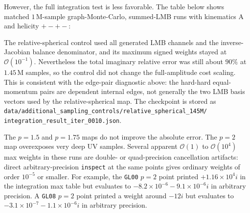 \documentclass[11pt]{article}
\begin{document}
However, the full integration test is less favorable.  The table below shows
matched \(1\,\mathrm{M}\)-sample graph-Monte-Carlo, summed-LMB runs with
kinematics A and helicity \(+-+-\):
\begin{center}
\scriptsize
{}
\end{center}
The relative-spherical control used all generated LMB channels and the
inverse-Jacobian balance denominator, and its maximum signed weights stayed at
\(\mathcal{O}(10^{-1})\).  Nevertheless the total imaginary relative error was
still about \(90\%\) at \(1.45\,\mathrm{M}\) samples, so the control did not
change the full-amplitude cost scaling.  This is consistent with the edge-pair
diagnostic above: the hard-hard equal-momentum pairs are dependent internal
edges, not generally the two LMB basis vectors used by the relative-spherical
map.  The checkpoint is stored as
\texttt{data/additional\_sampling\_controls/relative\_spherical\_145M/}
\texttt{integration\_result\_iter\_0010.json}.

The \(p=1.5\) and \(p=1.75\) maps do not improve the absolute error.  The
\(p=2\) map overexposes very deep UV samples.  Several apparent
\(\mathcal{O}(1)\) to \(\mathcal{O}(10^4)\) max weights in these runs are
double- or quad-precision cancellation artifacts: direct arbitrary-precision
\texttt{inspect} at the same points gives ordinary weights of order
\(10^{-5}\) or smaller.  For example, the \texttt{GL00} \(p=2\) point printed
\(+1.16\times10^4 i\) in the integration max table but evaluates to
\(-8.2\times10^{-6}-9.1\times10^{-6}i\) in arbitrary precision.  A
\texttt{GL08} \(p=2\) point printed a weight around \(-12i\) but evaluates to
\(-3.1\times10^{-7}-1.1\times10^{-6}i\) in arbitrary precision.
\end{document}
